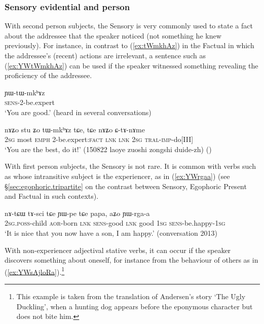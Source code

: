 \subsubsection{Sensory evidential and person} \label{sec:sensory.person}
With second person subjects, the Sensory is very commonly used to state a fact about the addressee that the speaker noticed (not something he knew previously). For instance, in contrast to (\ref{ex:tWmkhAz}) in the Factual in which the addressee's (recent) actions are irrelevant, a sentence such as (\ref{ex:YWtWmkhAz}) can be used if the speaker witnessed something revealing the proficiency of the addressee.

\begin{exe}
\ex \label{ex:YWtWmkhAz}
\gll  ɲɯ-tɯ-mkʰɤz \\
\textsc{sens}-2-be.expert \\
\glt `You are good.' (heard in several conversations)
\end{exe}

\begin{exe}
\ex \label{ex:tWmkhAz}
\gll nɤʑo stu ʑo tɯ-mkʰɤz tɕe, tɕe nɤʑo ɕ-tɤ-nɤme \\
\textsc{2sg} most \textsc{emph} 2-be.expert:\textsc{fact}   \textsc{lnk} \textsc{lnk} \textsc{2sg} \textsc{tral}-\textsc{imp}-do[III] \\
\glt `You are the best, do it!' (150822 laoye zuoshi zongshi duide-zh)
()
\end{exe}


With first person subjects, the Sensory is not rare. It is common with verbs such as  whose intransitive subject is the experiencer, as in (\ref{ex:YWrgaa}) (see §\ref{sec:egophoric.tripartite} on the contrast between Sensory, Egophoric Present and Factual in such contexts).

\begin{exe}
\ex \label{ex:YWrgaa}
\gll nɤ-tɕɯ tɤ-sci tɕe ɲɯ-pe tɕe papa, aʑo ɲɯ-rga-a\\
 \textsc{2sg}.\textsc{poss}-child \textsc{aor}-born \textsc{lnk} \textsc{sens}-good \textsc{lnk} good  \textsc{1sg} \textsc{sens}-be.happy-\textsc{1sg}\\
\glt `It is nice that you now have a son, I am happy.' (conversation 2013)
\end{exe}

With non-experiencer adjectival stative verbs, it can occur if the speaker discovers something about oneself, for instance from the behaviour of others as in (\ref{ex:YWsAjloRa}).\footnote{This example is taken from the translation of Andersen's story `The Ugly Duckling', when a hunting dog appears before the eponymous character but does not bite him. }

